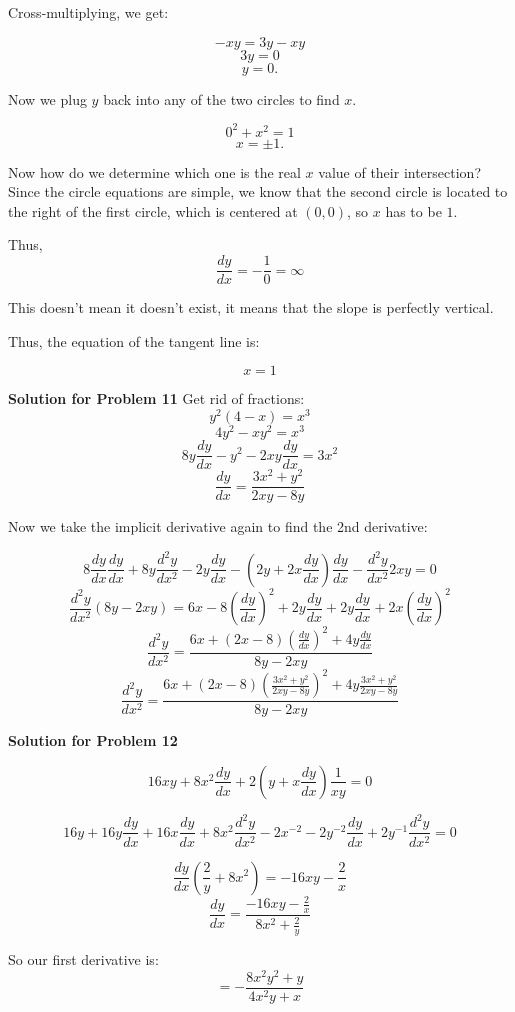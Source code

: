 \documentclass{article}
\newcommand \der {\frac {dy} {dx}}
\newcommand \ders {\left( \frac {dy} {dx} \right)^{2}}
\newcommand \derr {\frac {d^{2}y} {dx^2}}
\begin{document}
Cross-multiplying, we get:

\[-xy = 3y - xy\]
\[3y = 0\]
\[y = 0.\]

Now we plug $y$ back into any of the two circles to find $x$.

\[0^2 + x^2 = 1\]
\[x = \pm 1.\]

Now how do we determine which one is the real $x$ value of their intersection? Since the circle equations are simple, we know that the second circle is located to the right of the first circle, which is centered at $(0, 0)$, so $x$ has to be $1$.

Thus,
\[\der = -\frac {1} {0} = \infty\]

This doesn't mean it doesn't exist, it means that the slope is perfectly vertical.

Thus, the equation of the tangent line is:

\[\boxed{x = 1}\]


\vspace{1cm}


\textbf{Solution for Problem 11} Get rid of fractions:\\

\[y^2\left( 4 - x \right) = x^3\]
\[4y^2 - xy^2 = x^3\]
\[8y\der - y^2 - 2xy\der = 3x^2\]
\[\der = \frac {3x^2 + y^2} {2xy - 8y}\]

Now we take the implicit derivative again to find the 2nd derivative:

\[8\der \der + 8y \derr - 2y\der - \left( 2y + 2x\der \right)\der - \derr 2xy = 0\]
\[\derr \left( 8y - 2xy\right) = 6x - 8\ders + 2y\der + 2y\der + 2x\ders \]
\[\derr = \dfrac {6x + \left( 2x - 8 \right) \ders + 4y\der} {8y - 2xy}\]
\[\derr = \dfrac {6x + \left( 2x - 8 \right)\left( \frac {3x^2 + y^2} {2xy - 8y} \right)^{2} + 4y\frac {3x^2 + y^2} {2xy - 8y}} {8y - 2xy}\]


\vspace{1cm}

\textbf{Solution for Problem 12} 

\[ 16xy + 8x^2\der + 2\left( y + x\der \right)\frac {1} {xy} = 0\]


\[16y + 16y\der + 16x\der + 8x^2\derr - 2x^{-2} - 2y^{-2}\der + 2y^{-1}\derr = 0\]

\[\der \left( \frac {2} {y} + 8x^2 \right) = -16xy - \frac {2} {x}\]
\[\der = \dfrac {-16xy - \frac {2} {x}} {8x^2 + \frac {2} {y}}\]

So our first derivative is:
\[= -\frac {8x^2y^2 + y} {4x^2y + x}\]

\newpage
\end{document}
